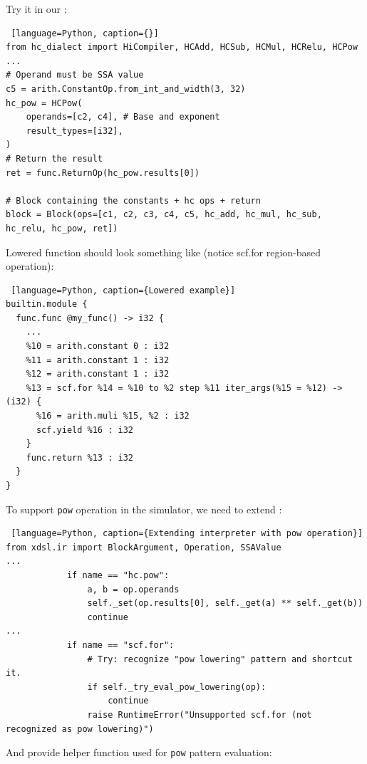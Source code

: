 \documentclass[../main.tex]{subfiles}
\begin{document}
Try it in our :
\begin{lstlisting} [language=Python, caption={}]
from hc_dialect import HiCompiler, HCAdd, HCSub, HCMul, HCRelu, HCPow
...
# Operand must be SSA value
c5 = arith.ConstantOp.from_int_and_width(3, 32)
hc_pow = HCPow(
    operands=[c2, c4], # Base and exponent
    result_types=[i32],
)
# Return the result
ret = func.ReturnOp(hc_pow.results[0])

# Block containing the constants + hc ops + return
block = Block(ops=[c1, c2, c3, c4, c5, hc_add, hc_mul, hc_sub, hc_relu, hc_pow, ret])
\end{lstlisting}

Lowered function should look something like (notice scf.for region-based operation):
\begin{lstlisting} [language=Python, caption={Lowered example}]
builtin.module {
  func.func @my_func() -> i32 {
    ...
    %10 = arith.constant 0 : i32
    %11 = arith.constant 1 : i32
    %12 = arith.constant 1 : i32
    %13 = scf.for %14 = %10 to %2 step %11 iter_args(%15 = %12) -> (i32) {
      %16 = arith.muli %15, %2 : i32
      scf.yield %16 : i32
    }
    func.return %13 : i32
  }
}
\end{lstlisting}
To support \texttt{pow} operation in the simulator, we need to extend :
\begin{lstlisting} [language=Python, caption={Extending interpreter with pow operation}]
from xdsl.ir import BlockArgument, Operation, SSAValue
...
            if name == "hc.pow":
                a, b = op.operands
                self._set(op.results[0], self._get(a) ** self._get(b))
                continue
...
            if name == "scf.for":
                # Try: recognize "pow lowering" pattern and shortcut it.
                if self._try_eval_pow_lowering(op):
                    continue
                raise RuntimeError("Unsupported scf.for (not recognized as pow lowering)")
\end{lstlisting}
And provide helper function used for \texttt{pow} pattern evaluation:
\end{document}
